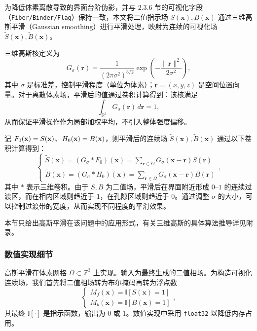 为降低体素离散导致的界面台阶伪影，并与 2.3.6 节的可视化字段（\texttt{Fiber/Binder/Flag}）保持一致，本文将二值指示场 $S(\textbf{x}), B(\textbf{x})$ 通过三维高斯平滑（Gaussian smoothing）\cite{sarkka2013gaussian,deisenroth2010probabilistic}进行平滑处理，映射为连续的可视化场 $\tilde{S}(\textbf{x}), \tilde{B}(\textbf{x})$。

三维高斯核定义为
\begin{equation}
G_{\sigma}(\textbf{r}) = \frac{1}{(2\pi\sigma^2)^{3/2}} \exp\left(-\frac{\|\textbf{r}\|^2}{2\sigma^2}\right),
\end{equation}
其中 $\sigma$ 是标准差，控制平滑程度（单位为体素）；$\textbf{r} = (x,y,z)$ 是空间位置向量。对于离散体素场，平滑后的值通过卷积计算得到：该核满足
\begin{equation}
\int_{\mathbb{R}^3} G_{\sigma}(\textbf{r}) \, d\textbf{r} = 1,
\end{equation}
从而保证平滑操作作为局部加权平均，不引入整体强度偏移。

记 $F_0(\textbf x) = S(\textbf x)$、$H_0(\textbf x) = B(\textbf x)$，则平滑后的连续场 $\tilde{S}(\textbf{x}), \tilde{B}(\textbf{x})$ 通过以下卷积计算得到：
\begin{equation}
\begin{cases}
\tilde{S}(\textbf{x}) = (G_{\sigma} * F_0)(\textbf{x}) = \sum_{\textbf{r} \in \Omega} G_{\sigma}(\textbf{x}-\textbf{r}) S(\textbf{r})\\
\tilde{B}(\textbf{x}) = (G_{\sigma} * H_0)(\textbf{x}) = \sum_{\textbf{r} \in \Omega} G_{\sigma}(\textbf{x}-\textbf{r}) B(\textbf{r})
\end{cases}
,
\end{equation}
其中 $*$ 表示三维卷积。由于 $S,B$ 为二值场，平滑后在界面附近形成 $0$--$1$ 的连续过渡区，而在相内区域则趋近于 $1$，在孔隙区域则趋近于 $0$。通过调整 $\sigma$ 的大小，可以控制过渡带的宽度，从而实现不同程度的平滑效果。

本节只给出高斯平滑在该问题中的应用形式，有关三维高斯的具体算法推导详见附录。

\subsubsection{\textbf{数值实现细节}}

高斯平滑在体素网格 $\Omega \subset \mathbb{Z}^3$ 上实现。输入为最终生成的二值相场。为构造可视化连续场，我们首先将二值相场转为布尔掩码再转为浮点数
\begin{equation}
\begin{cases}
M_f(\textbf{x}) = \mathbb{I}[S(\textbf{x})=1]\\
M_b(\textbf{x}) = \mathbb{I}[B(\textbf{x})=1]
\end{cases}
,
\end{equation}
其最终 $\mathbb{I}[\cdot]$ 是指示函数，输出为 $0$ 或 $1$。数值实现中采用 \texttt{float32} 以降低内存占用。

